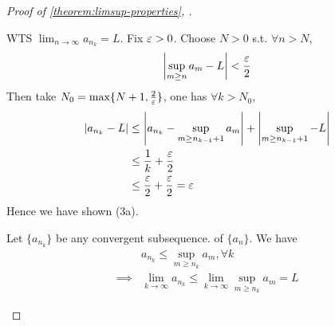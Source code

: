 \begin{proof}[Proof of 
        \ref{theorem:limsup-properties},
    ]
\begin{itemize}
\begin{enumerate}
            WTS $\lim_{n \to \infty}a_{n_k} = L$.
            Fix $ \varepsilon > 0$. Choose $N > 0$ s.t. 
            $\forall n > N$,
            \[
                \left| \sup_{m \geq n} a_m - L\right|  < \frac{\varepsilon}{2}
            \]
            Then take $N_0 = \max \{ N + 1, \frac{2}{\varepsilon} \} $,
            one has $\forall k > N_0$, 
            \begin{align*}
                \left|a_{n_k}- L \right| &\leq 
                \left| a_{n_k} - \sup_{m \geq n_{k -1} + 1} a_m \right|  
                +
                \left| \sup_{m \geq n_{k -1} + 1} - L\right|  \\
                & \leq \frac{1}{k} + \frac{\varepsilon}{2} \\
                & \leq \frac{\varepsilon}{2} + \frac{\varepsilon}{2} = \varepsilon
            \end{align*}
            Hence we have shown (3a). 
            \medskip

            Let $\{ a_{n_k} \} $ be any convergent subsequence.
            of $ \{ a_n \} $. We have
            \begin{align*}
                &a_{n_k} \leq \sup_{m \geq n_k} a_m, \forall k \\
                \implies & 
                \lim_{k \to \infty} a_{n_k} \leq 
                \lim_{k \to \infty} \sup_{m \geq n_k} a_m = L
            \end{align*}
        \end{enumerate}
    \end{itemize}
\end{proof}





